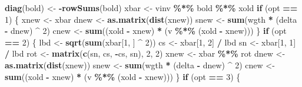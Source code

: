 \documentclass[
  12pt,
]{article}
\newenvironment{Shaded}{\begin{snugshade}}{\end{snugshade}}
\newcommand{\ControlFlowTok}[1]{\textcolor[rgb]{0.13,0.29,0.53}{\textbf{#1}}}
\newcommand{\DecValTok}[1]{\textcolor[rgb]{0.00,0.00,0.81}{#1}}
\newcommand{\FunctionTok}[1]{\textcolor[rgb]{0.13,0.29,0.53}{\textbf{#1}}}
\newcommand{\NormalTok}[1]{#1}
\newcommand{\OtherTok}[1]{\textcolor[rgb]{0.56,0.35,0.01}{#1}}
\newcommand{\SpecialCharTok}[1]{\textcolor[rgb]{0.81,0.36,0.00}{\textbf{#1}}}
\begin{document}
\begin{Shaded}
\begin{Highlighting}[]
    \FunctionTok{diag}\NormalTok{(bold) }\OtherTok{\textless{}{-}} \SpecialCharTok{{-}}\FunctionTok{rowSums}\NormalTok{(bold)}
\NormalTok{    xbar }\OtherTok{\textless{}{-}}\NormalTok{ vinv }\SpecialCharTok{\%*\%}\NormalTok{ bold }\SpecialCharTok{\%*\%}\NormalTok{ xold}
    \ControlFlowTok{if}\NormalTok{ (opt }\SpecialCharTok{==} \DecValTok{1}\NormalTok{) \{}
\NormalTok{      xnew }\OtherTok{\textless{}{-}}\NormalTok{ xbar}
\NormalTok{      dnew }\OtherTok{\textless{}{-}} \FunctionTok{as.matrix}\NormalTok{(}\FunctionTok{dist}\NormalTok{(xnew))}
\NormalTok{      snew }\OtherTok{\textless{}{-}} \FunctionTok{sum}\NormalTok{(wgth }\SpecialCharTok{*}\NormalTok{ (delta }\SpecialCharTok{{-}}\NormalTok{ dnew) }\SpecialCharTok{\^{}} \DecValTok{2}\NormalTok{)}
\NormalTok{      cnew }\OtherTok{\textless{}{-}} \FunctionTok{sum}\NormalTok{((xold }\SpecialCharTok{{-}}\NormalTok{ xnew) }\SpecialCharTok{*}\NormalTok{ (v }\SpecialCharTok{\%*\%}\NormalTok{ (xold }\SpecialCharTok{{-}}\NormalTok{ xnew)))}
\NormalTok{    \}}
    \ControlFlowTok{if}\NormalTok{ (opt }\SpecialCharTok{==} \DecValTok{2}\NormalTok{) \{}
\NormalTok{      lbd }\OtherTok{\textless{}{-}} \FunctionTok{sqrt}\NormalTok{(}\FunctionTok{sum}\NormalTok{(xbar[}\DecValTok{1}\NormalTok{, ] }\SpecialCharTok{\^{}} \DecValTok{2}\NormalTok{))}
\NormalTok{      cs }\OtherTok{\textless{}{-}}\NormalTok{ xbar[}\DecValTok{1}\NormalTok{, }\DecValTok{2}\NormalTok{] }\SpecialCharTok{/}\NormalTok{ lbd}
\NormalTok{      sn }\OtherTok{\textless{}{-}}\NormalTok{ xbar[}\DecValTok{1}\NormalTok{, }\DecValTok{1}\NormalTok{] }\SpecialCharTok{/}\NormalTok{ lbd}
\NormalTok{      rot }\OtherTok{\textless{}{-}} \FunctionTok{matrix}\NormalTok{(}\FunctionTok{c}\NormalTok{(sn, cs, }\SpecialCharTok{{-}}\NormalTok{cs, sn), }\DecValTok{2}\NormalTok{, }\DecValTok{2}\NormalTok{)}
\NormalTok{      xnew }\OtherTok{\textless{}{-}}\NormalTok{ xbar }\SpecialCharTok{\%*\%}\NormalTok{ rot}
\NormalTok{      dnew }\OtherTok{\textless{}{-}} \FunctionTok{as.matrix}\NormalTok{(}\FunctionTok{dist}\NormalTok{(xnew))}
\NormalTok{      snew }\OtherTok{\textless{}{-}} \FunctionTok{sum}\NormalTok{(wgth }\SpecialCharTok{*}\NormalTok{ (delta }\SpecialCharTok{{-}}\NormalTok{ dnew) }\SpecialCharTok{\^{}} \DecValTok{2}\NormalTok{)}
\NormalTok{      cnew }\OtherTok{\textless{}{-}} \FunctionTok{sum}\NormalTok{((xold }\SpecialCharTok{{-}}\NormalTok{ xnew) }\SpecialCharTok{*}\NormalTok{ (v }\SpecialCharTok{\%*\%}\NormalTok{ (xold }\SpecialCharTok{{-}}\NormalTok{ xnew)))}
\NormalTok{    \}}
    \ControlFlowTok{if}\NormalTok{ (opt }\SpecialCharTok{==} \DecValTok{3}\NormalTok{) \{}

\end{Highlighting}
\end{Shaded}
\end{document}
